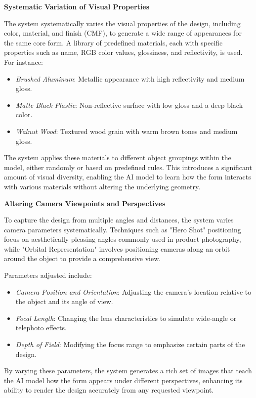 \documentclass{article}
\begin{document}
\textbf{Systematic Variation of Visual Properties}

The system systematically varies the visual properties of the design, including color, material, and finish (CMF), to generate a wide range of appearances for the same core form. A library of predefined materials, each with specific properties such as name, RGB color values, glossiness, and reflectivity, is used. For instance:

\begin{itemize}
    \item \textit{Brushed Aluminum}: Metallic appearance with high reflectivity and medium gloss.
    \item \textit{Matte Black Plastic}: Non-reflective surface with low gloss and a deep black color.
    \item \textit{Walnut Wood}: Textured wood grain with warm brown tones and medium gloss.
\end{itemize}

The system applies these materials to different object groupings within the model, either randomly or based on predefined rules. This introduces a significant amount of visual diversity, enabling the AI model to learn how the form interacts with various materials without altering the underlying geometry.

\textbf{Altering Camera Viewpoints and Perspectives}

To capture the design from multiple angles and distances, the system varies camera parameters systematically. Techniques such as "Hero Shot" positioning focus on aesthetically pleasing angles commonly used in product photography, while "Orbital Representation" involves positioning cameras along an orbit around the object to provide a comprehensive view.

Parameters adjusted include:

\begin{itemize}
    \item \textit{Camera Position and Orientation}: Adjusting the camera's location relative to the object and its angle of view.
    \item \textit{Focal Length}: Changing the lens characteristics to simulate wide-angle or telephoto effects.
    \item \textit{Depth of Field}: Modifying the focus range to emphasize certain parts of the design.
\end{itemize}

By varying these parameters, the system generates a rich set of images that teach the AI model how the form appears under different perspectives, enhancing its ability to render the design accurately from any requested viewpoint. 
\end{document}
